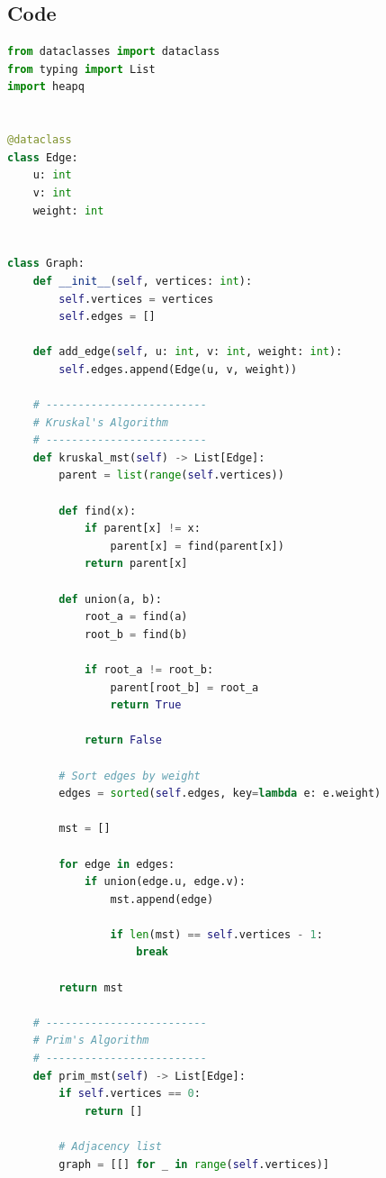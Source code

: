 

\subsection*{Code}
\begin{lstlisting}[language=Python]
from dataclasses import dataclass
from typing import List
import heapq


@dataclass
class Edge:
    u: int
    v: int
    weight: int


class Graph:
    def __init__(self, vertices: int):
        self.vertices = vertices
        self.edges = []

    def add_edge(self, u: int, v: int, weight: int):
        self.edges.append(Edge(u, v, weight))

    # -------------------------
    # Kruskal's Algorithm
    # -------------------------
    def kruskal_mst(self) -> List[Edge]:
        parent = list(range(self.vertices))

        def find(x):
            if parent[x] != x:
                parent[x] = find(parent[x])
            return parent[x]

        def union(a, b):
            root_a = find(a)
            root_b = find(b)

            if root_a != root_b:
                parent[root_b] = root_a
                return True

            return False

        # Sort edges by weight
        edges = sorted(self.edges, key=lambda e: e.weight)

        mst = []

        for edge in edges:
            if union(edge.u, edge.v):
                mst.append(edge)

                if len(mst) == self.vertices - 1:
                    break

        return mst

    # -------------------------
    # Prim's Algorithm
    # -------------------------
    def prim_mst(self) -> List[Edge]:
        if self.vertices == 0:
            return []

        # Adjacency list
        graph = [[] for _ in range(self.vertices)]


\end{lstlisting}
